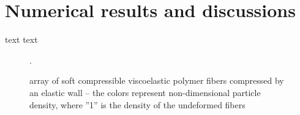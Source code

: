 \section{Numerical results and discussions}
\label{results}

text text

\begin{figure}[H]
\centering
{} 
\caption{array of soft compressible viscoelastic polymer fibers compressed by an elastic wall – the colors represent non-dimensional particle density, where ”1” is the density of the undeformed fibers}
\label{Fibers_Bending}.
\end{figure}
